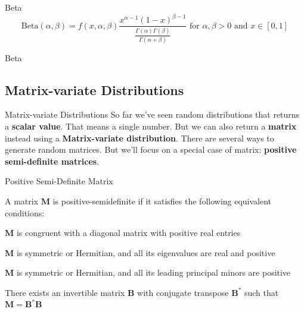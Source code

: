 \begin{frame}[noframenumbering]{Beta}
	$$\text{Beta} (\alpha, \beta) = f(x, \alpha, \beta) \frac{x^{\alpha-1}(1-x)^{\beta-1}} {\frac{\Gamma (\alpha )\Gamma (\beta )}{\Gamma (\alpha +\beta )}} \text{ for $\alpha,\beta > 0$ and $x \in [0, 1]$}$$
\end{frame}

\begin{frame}[noframenumbering]{Beta}
	\centering
\end{frame}

\subsection*{Matrix-variate Distributions}
\begin{frame}[noframenumbering]{Matrix-variate Distributions}
	So far we've seen random distributions that returns a \textbf{scalar value}.
	That means a single number.
	\vfill
	But we can also return a \textbf{matrix} instead using a \textbf{Matrix-variate distribution}.
	\vfill
	There are several ways to generate random matrices.
	But we'll focus on a special case of matrix: \textbf{positive semi-definite matrices}.
\end{frame}

\begin{frame}[noframenumbering]{Positive Semi-Definite Matrix}
	\begin{defn}
		A matrix $\mathbf{M}$ is positive-semidefinite if it satisfies the following equivalent conditions:
		\begin{vfilleditems}
			\item $\mathbf{M}$ is congruent with a diagonal matrix with positive real entries
			\item $\mathbf{M}$ is symmetric or Hermitian, and all its eigenvalues are real and positive
			\item $\mathbf{M}$ is symmetric or Hermitian, and all its leading principal minors are positive
			\item There exists an invertible matrix $\mathbf{B}$ with conjugate transpose $\mathbf{B}^*$ such that $\mathbf{M} = \mathbf{B}^* \mathbf{B}$
		\end{vfilleditems}
	\end{defn}
\end{frame}

